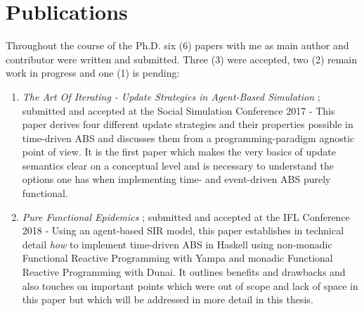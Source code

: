 \section*{Publications}
Throughout the course of the Ph.D. six (6) papers with me as main author and contributor were written and submitted. Three (3) were accepted, two (2) remain work in progress and one (1) is pending:


\begin{enumerate}
	\item \textit{The Art Of Iterating - Update Strategies in Agent-Based Simulation} \cite{thaler_art_2017}; submitted and accepted at the Social Simulation Conference 2017 - This paper derives four different update strategies and their properties possible in time-driven ABS and discusses them from a programming-paradigm agnostic point of view. It is the first paper which makes the very basics of update semantics clear on a conceptual level and is necessary to understand the options one has when implementing time- and event-driven ABS purely functional. %
	
	\item \textit{Pure Functional Epidemics} \cite{thaler_pure_2018}; submitted and accepted at the IFL Conference 2018 - Using an agent-based SIR model, this paper establishes in technical detail \textit{how} to implement time-driven ABS in Haskell using non-monadic Functional Reactive Programming with Yampa and monadic Functional Reactive Programming with Dunai. It outlines benefits and drawbacks and also touches on important points which were out of scope and lack of space in this paper but which will be addressed in more detail in this thesis. %
	

\end{enumerate}
